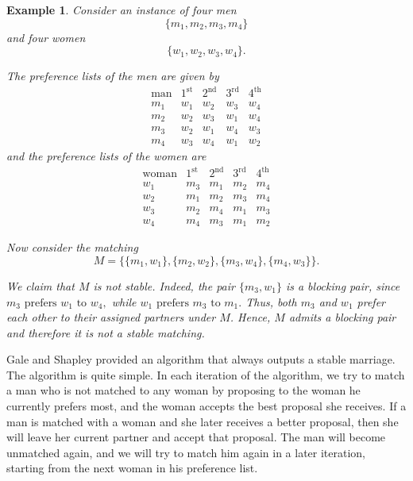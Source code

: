 \documentclass[12pt]{report}
\newtheorem{eexample}[base]{Example}
\numberwithin{algorithm}{chapter}
\begin{document}
	\clearpage
	\newpage 
	\begin{eexample}
		Consider an instance of four men
		\[
		\{m_{1},m_{2},m_{3},m_{4}\}
		\]
		and four women
		\[
		\{w_{1},w_{2},w_{3},w_{4}\}.
		\]
		
		The preference lists of the men are given by
		\[
		\begin{array}{c|cccc}
			\text{man} & 1^{\text{st}} & 2^{\text{nd}} & 3^{\text{rd}} & 4^{\text{th}} \\ \hline
			m_{1} & w_{1} & w_{2} & w_{3} & w_{4} \\
			m_{2} & w_{2} & w_{3} & w_{1} & w_{4} \\
			m_{3} & w_{2} & w_{1} & w_{4} & w_{3} \\
			m_{4} & w_{3} & w_{4} & w_{1} & w_{2}
		\end{array}
		\]
		and the preference lists of the women are
		\[
		\begin{array}{c|cccc}
			\text{woman} & 1^{\text{st}} & 2^{\text{nd}} & 3^{\text{rd}} & 4^{\text{th}} \\ \hline
			w_{1} & m_{3} & m_{1} & m_{2} & m_{4} \\
			w_{2} & m_{1} & m_{2} & m_{3} & m_{4} \\
			w_{3} & m_{2} & m_{4} & m_{1} & m_{3} \\
			w_{4} & m_{4} & m_{3} & m_{1} & m_{2}
		\end{array}
		\]
		
		Now consider the matching
		\[
		M=\{\{m_{1},w_{1}\},\{m_{2},w_{2}\},\{m_{3},w_{4}\},\{m_{4},w_{3}\}\}.
		\]
		
		We claim that $M$ is not stable. Indeed, the pair $\{m_{3}, w_{1}\}$ is a blocking pair, since
		$ m_{3} \text{ prefers } w_{1} \text{ to } w_{4}, $
		while
		$ w_{1} \text{ prefers } m_{3} \text{ to } m_{1}.$
		Thus, both $m_{3}$ and $w_{1}$ prefer each other to their assigned partners under $M$. Hence, $M$ admits a blocking pair and therefore it is not a stable matching.
	\end{eexample}

	Gale and Shapley \cite{Gale01011962} provided an algorithm that always outputs a stable marriage. The algorithm is quite simple. In each iteration of the algorithm, we try to match a man who is not matched to any woman by proposing to the woman he currently prefers most, and the woman accepts the best proposal she receives. If a man is matched with a woman and she later receives a better proposal, then she will leave her current partner and accept that proposal. The man will become unmatched again, and we will try to match him again in a later iteration, starting from the next woman in his preference list.
\end{document}

